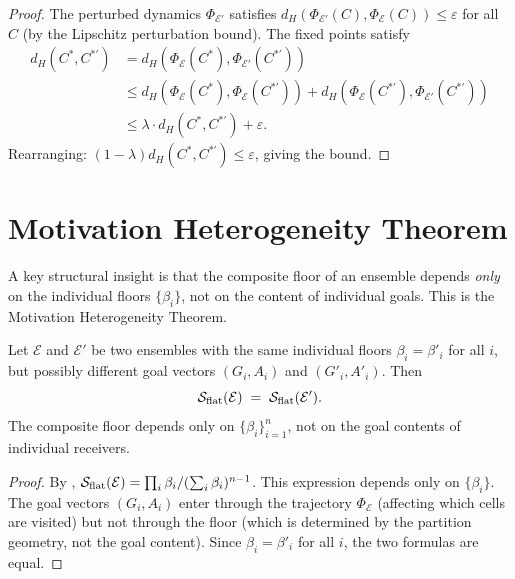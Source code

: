 \begin{proof}
The perturbed dynamics $\Phi_{\mathcal{E}'}$ satisfies
$d_H(\Phi_{\mathcal{E}'}(C), \Phi_\mathcal{E}(C)) \leq \varepsilon$ for all
$C$ (by the Lipschitz perturbation bound).  The fixed points satisfy
\begin{align*}
  d_H(C^*, C^{*'})
  &= d_H(\Phi_\mathcal{E}(C^*), \Phi_{\mathcal{E}'}(C^{*'})) \\
  &\leq d_H(\Phi_\mathcal{E}(C^*), \Phi_\mathcal{E}(C^{*'}))
    + d_H(\Phi_\mathcal{E}(C^{*'}), \Phi_{\mathcal{E}'}(C^{*'})) \\
  &\leq \lambda \cdot d_H(C^*, C^{*'}) + \varepsilon .
\end{align*}
Rearranging: $(1-\lambda) d_H(C^*, C^{*'}) \leq \varepsilon$, giving the
bound.
\end{proof}

\section{Motivation Heterogeneity Theorem}
\label{sec:motivation-heterogeneity}

A key structural insight is that the composite floor of an ensemble depends
\emph{only} on the individual floors $\{\beta_i\}$, not on the content of
individual goals.  This is the Motivation Heterogeneity Theorem.

\begin{theorem}
\label{thm:motivation-heterogeneity}
Let $\mathcal{E}$ and $\mathcal{E}'$ be two ensembles with the same individual
floors $\beta_i = \beta'_i$ for all $i$, but possibly different goal vectors
$(G_i, A_i)$ and $(G'_i, A'_i)$.  Then
\[
  \mathcal{S}_{\mathrm{flat}}(\mathcal{E}) \;=\; \mathcal{S}_{\mathrm{flat}}(\mathcal{E}') .
\]
The composite floor depends only on $\{\beta_i\}_{i=1}^n$, not on the goal
contents of individual receivers.
\end{theorem}

\begin{proof}
By , $\mathcal{S}_{\mathrm{flat}}(\mathcal{E}) =
\prod_i \beta_i / (\sum_i \beta_i)^{n-1}$.  This expression depends only on
$\{\beta_i\}$.  The goal vectors $(G_i, A_i)$ enter through the trajectory
$\Phi_\mathcal{E}$ (affecting which cells are visited) but not through the
floor (which is determined by the partition geometry, not the goal content).
Since $\beta_i = \beta'_i$ for all $i$, the two formulas are equal.
\end{proof}

